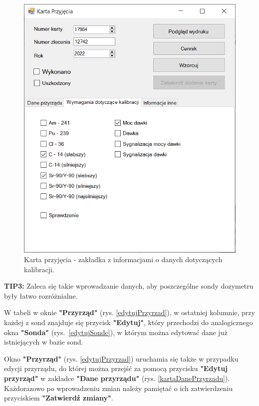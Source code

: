 \begin{figure}[htb]
	\centering
	\includegraphics{obrazki/Biuro/karta/karta_dane_wymagania.png}
	\caption{Karta przyjęcia - zakładka z informacjami o danych dotyczących kalibracji.}
	\label{kartaDaneKalibracji}
\end{figure}

\textbf{TIP3:} Zaleca się takie wprowadzanie danych, aby poszczególne sondy dozymetru były łatwo rozróżnialne.

W tabeli w oknie \textbf{"Przyrząd"} (rys. \ref{edytujPrzyrzad}), w ostatniej kolumnie, przy każdej z sond znajduje się przycisk \textbf{"Edytuj"}, który przechodzi do analogicznego okna \textbf{"Sonda"} (rys.~\ref{edytujSonde}), w którym można edytować dane już istniejących w bazie sond. 

Okno \textbf{"Przyrząd"} (rys. \ref{edytujPrzyrzad}) uruchamia się także w przypadku edycji przyrządu, do której można przejść za pomocą przycisku \textbf{"Edytuj przyrząd"} w zakładce \textbf{"Dane przyrządu"} (rys. \ref{kartaDanePrzyrzadu}). Każdorazowo po wprowadzeniu zmian należy pamiętać o ich zatwierdzeniu przyciskiem \textbf{"Zatwierdź zmiany"}.
 
